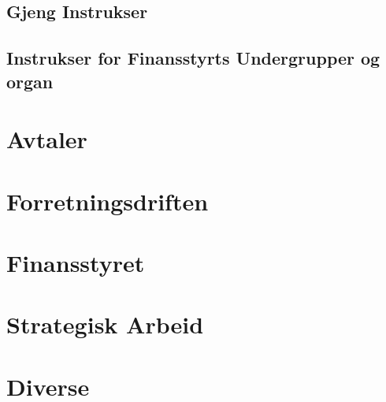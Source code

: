\documentclass[11pt, a4paper, twosided]{book}
\begin{document}
\chapter*{Gjeng Instrukser}




































\chapter*{Instrukser for Finansstyrts Undergrupper og organ}
















\part{Avtaler}




\part{Forretningsdriften}





\part{Finansstyret}





\part{Strategisk Arbeid}




\part{Diverse}


\end{document}
